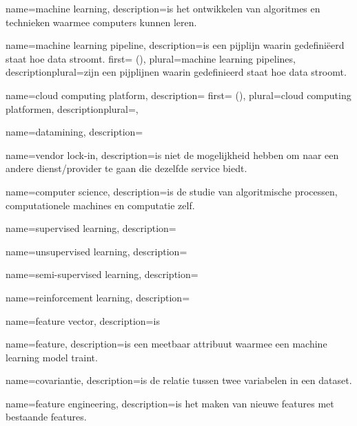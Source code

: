 {
    name=machine learning,
    description={is het ontwikkelen van algoritmes en technieken waarmee computers kunnen leren.}
}

{
    name=machine learning pipeline,
    description={is een pijplijn waarin gedefiniëerd staat hoe data stroomt.}
    first={ ()},
    plural={machine learning pipelines},
    descriptionplural={zijn een pijplijnen waarin gedefinieerd staat hoe data stroomt.}   
}

{
    name=cloud computing platform,
    description={}
    first={ ()},
    plural={cloud computing platformen},
    descriptionplural={},
}

{
    name=datamining,
    description={}
}

{
    name=vendor lock-in,
    description={is niet de mogelijkheid hebben om naar een andere dienst/provider te gaan die dezelfde service biedt.}
}

{
    name=computer science,
    description={is de studie van algoritmische processen, computationele machines en computatie zelf.}
}

{
    name=supervised learning,
    description={}
}

{
    name=unsupervised learning,
    description={}
}

{
    name=semi-supervised learning,
    description={}
}

{
    name=reinforcement learning,
    description={}
}

{
    name=feature vector,
    description={is }
}

{
    name=feature,
    description={is een meetbaar attribuut waarmee een machine learning model traint.}
}

{
    name=covariantie,
    description={is de relatie tussen twee variabelen in een dataset.}
}

{
    name=feature engineering,
    description={is het maken van nieuwe features met bestaande features.}
}

